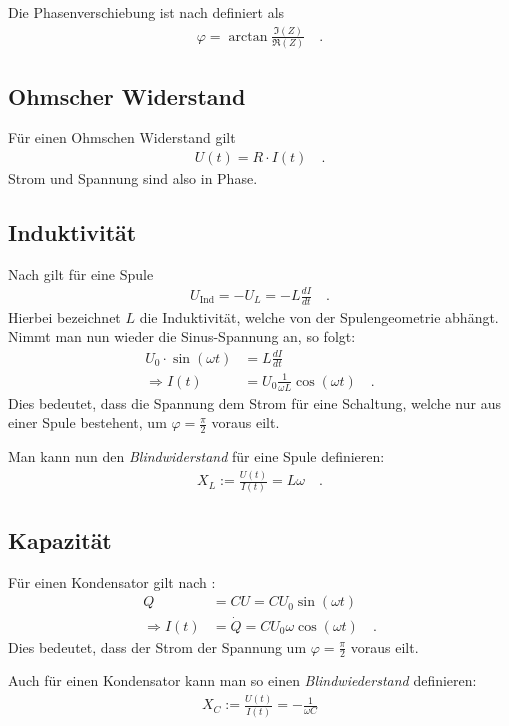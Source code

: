 \documentclass[12pt,a4paper,titlepage,headinclude,bibtotoc]{scrartcl}
\begin{document}
Die Phasenverschiebung ist nach \cite[S. 236]{nolting3} definiert als
\begin{align}
\varphi=\arctan\frac{\Im(Z)}{\Re(Z)}\quad .
\end{align}

\subsection{Ohmscher Widerstand}
Für einen Ohmschen Widerstand gilt 
\begin{align*}
U(t)=R\cdot I(t)\quad .
\end{align*}
Strom und Spannung sind also in Phase.
\subsection{Induktivität}
Nach \cite[S. 313]{griffith} gilt für eine Spule
\begin{align}
U_\text{Ind}=-U_L=-L\frac{dI}{dt}\quad .
\end{align}
Hierbei bezeichnet $L$ die Induktivität, welche von der Spulengeometrie abhängt.
Nimmt man nun wieder die Sinus-Spannung an, so folgt:
\begin{align*}
U_0\cdot\sin(\omega t)&=L\frac{dI}{dt}\\
\Rightarrow I(t)&=U_0\frac{1}{\omega L}\cos(\omega t)\quad .
\end{align*}
Dies bedeutet, dass die Spannung dem Strom für eine Schaltung, welche nur aus einer Spule bestehent, um $\varphi=\frac{\pi}{2}$ voraus eilt.

Man kann nun den \emph{Blindwiderstand} für eine Spule definieren:
\begin{align}
X_L:=\frac{U(t)}{I(t)}=L\omega\quad .
\end{align}



\subsection{Kapazität}
Für einen Kondensator gilt nach \cite[S. 822]{giancoli}:
\begin{align*}
Q&=CU=CU_0\sin(\omega t)\\
\Rightarrow I(t)&=\dot Q=CU_0\omega\cos(\omega t)\quad .
\end{align*}
Dies bedeutet, dass der Strom der Spannung um $\varphi=\frac{\pi}{2}$ voraus eilt.

Auch für einen Kondensator kann man so einen \emph{Blindwiederstand} definieren:
\begin{align}
X_C:=\frac{U(t)}{I(t)}=-\frac{1}{\omega C}
\end{align}
\end{document}
